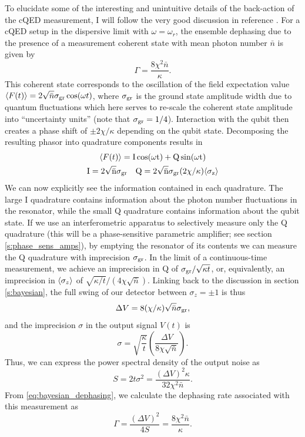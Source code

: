 To elucidate some of the interesting and unintuitive details of the back-action of the cQED measurement, I will follow the very good discussion in reference \cite{koro11}.  For a cQED setup in the dispersive limit with $\omega = \omega_r$, the ensemble dephasing due to the presence of a measurement coherent state with mean photon number $\bar{n}$ is given by
\begin{equation}
\Gamma = \frac{8 \chi^2 \bar{n}}{\kappa}.
\label{eq:cQED_dephasing}
\end{equation}
This coherent state corresponds to the oscillation of the field expectation value $\langle F(t)\rangle = 2 \sqrt{\bar{n}} \sigma_{\rm gr} \cos(\omega t)$, where $\sigma_{\rm gr}$ is the ground state amplitude width due to quantum fluctuations which here serves to re-scale the coherent state amplitude into ``uncertainty units'' (note that $\sigma_{\rm gr} = 1/4$).  Interaction with the qubit then creates a phase shift of $\pm 2 \chi/\kappa$ depending on the qubit state.  Decomposing the resulting phasor into quadrature components results in
\begin{gather}
\langle F(t)\rangle = \rm I \cos(\omega t) + \rm Q \sin(\omega t) \notag \\
\rm I = 2 \sqrt{\bar{n}} \sigma_{\rm gr} \quad \rm Q = 2 \sqrt{\bar{n}} \sigma_{\rm gr} (2 \chi / \kappa) \langle\sigma_z\rangle
\end{gather}
We can now explicitly see the information contained in each quadrature.  The large I quadrature contains information about the photon number fluctuations in the resonator, while the small Q quadrature contains information about the qubit state.  If we use an interferometric apparatus to selectively measure only the Q quadrature (this will be a phase-sensitive parametric amplifier; see section \ref{s:phase_sens_amps}), by emptying the resonator of its contents we can measure the Q quadrature with imprecision $\sigma_{\rm gr}$.  In the limit of a continuous-time measurement, we achieve an imprecision in Q of $\sigma_{\rm gr} / \sqrt{\kappa t}$, or, equivalently, an imprecision in $\langle\sigma_z\rangle$ of $\sqrt{\kappa/t}/(4 \chi \sqrt{\bar{n}})$.  Linking back to the discussion in section \ref{s:bayesian}, the full swing of our detector between $\sigma_z = \pm 1$ is thus
\begin{equation}
\Delta V = 8 (\chi/\kappa) \sqrt{\bar{n}} \sigma_{\rm gr},
\end{equation}
and the imprecision $\sigma$ in the output signal $V(t)$ is
\begin{equation}
\sigma = \sqrt{\frac{\kappa}{t}} \left( \frac{\Delta V}{8 \chi \sqrt{\bar{n}}} \right).
\end{equation}
Thus, we can express the power spectral density of the output noise as
\begin{equation}
S = 2 t \sigma^2 = \frac{ (\Delta V)^2 \kappa}{32 \chi^2 \bar{n}}.
\end{equation}
From \eqref{eq:bayesian_dephasing}, we calculate the dephasing rate associated with this measurement as
\begin{equation}
\Gamma = \frac{(\Delta V)^2}{4S} = \frac{8 \chi^2 \bar{n}}{\kappa}.
\end{equation}

